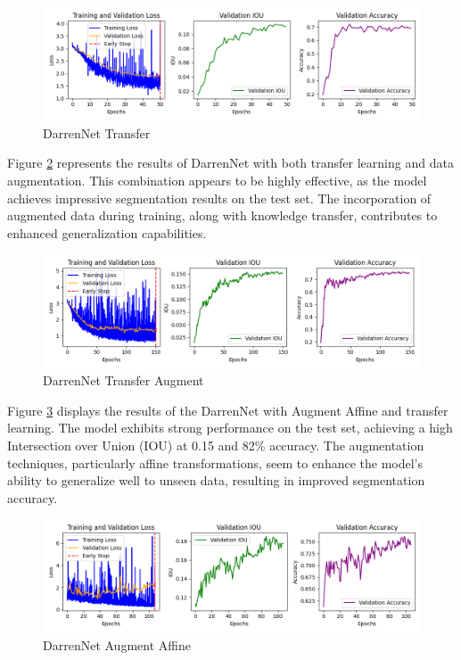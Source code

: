 \begin{figure}[H]
	\centering
	\includegraphics[width=\textwidth]{plots/darrennet_transfer}
	\caption{DarrenNet Transfer}
	\label{fig:darren_transfer}
\end{figure}


Figure \ref{fig:darren_transfer_aug} represents the results of DarrenNet with both transfer learning and data augmentation. This combination appears to be highly effective, as the model achieves impressive segmentation results on the test set. The incorporation of augmented data during training, along with knowledge transfer, contributes to enhanced generalization capabilities.

\begin{figure}[H]
	\centering
	\includegraphics[width=\textwidth]{plots/darrennet_transfer_augment}
	\caption{DarrenNet Transfer Augment}
	\label{fig:darren_transfer_aug}
\end{figure}

Figure \ref{fig:darren_aug_aff} displays the results of the DarrenNet with Augment Affine and transfer learning. The model exhibits strong performance on the test set, achieving a high Intersection over Union (IOU) at 0.15 and 82\% accuracy. The augmentation techniques, particularly affine transformations, seem to enhance the model's ability to generalize well to unseen data, resulting in improved segmentation accuracy.

\begin{figure}[H]
	\centering
	\includegraphics[width=\textwidth]{plots/darrennet_augment_affine}
	\caption{DarrenNet Augment Affine}
	\label{fig:darren_aug_aff}
\end{figure}


